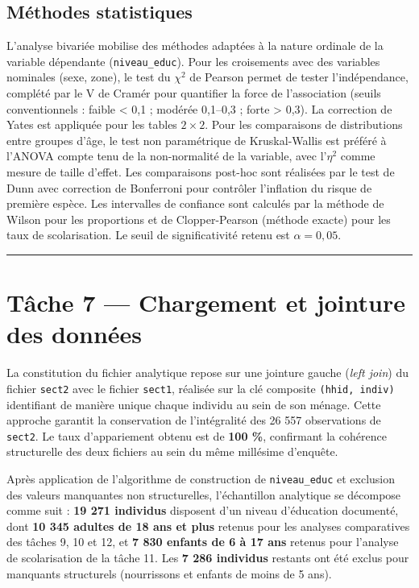 \documentclass[
]{article}
\begin{document}
\subsection{Méthodes statistiques}\label{muxe9thodes-statistiques}

L'analyse bivariée mobilise des méthodes adaptées à la nature ordinale
de la variable dépendante (\texttt{niveau\_educ}). Pour les croisements
avec des variables nominales (sexe, zone), le test du \(\chi^2\) de
Pearson permet de tester l'indépendance, complété par le V de Cramér
pour quantifier la force de l'association (seuils conventionnels :
faible \textless{} 0,1 ; modérée 0,1--0,3 ; forte \textgreater{} 0,3).
La correction de Yates est appliquée pour les tables \(2 \times 2\).
Pour les comparaisons de distributions entre groupes d'âge, le test non
paramétrique de Kruskal-Wallis est préféré à l'ANOVA compte tenu de la
non-normalité de la variable, avec l'\(\eta^2\) comme mesure de taille
d'effet. Les comparaisons post-hoc sont réalisées par le test de Dunn
avec correction de Bonferroni pour contrôler l'inflation du risque de
première espèce. Les intervalles de confiance sont calculés par la
méthode de Wilson pour les proportions et de Clopper-Pearson (méthode
exacte) pour les taux de scolarisation. Le seuil de significativité
retenu est \(\alpha = 0{,}05\).

\begin{center}\rule{0.5\linewidth}{0.5pt}\end{center}

\section{Tâche 7 --- Chargement et jointure des
données}\label{tuxe2che-7-chargement-et-jointure-des-donnuxe9es}

La constitution du fichier analytique repose sur une jointure gauche
(\emph{left join}) du fichier \texttt{sect2} avec le fichier
\texttt{sect1}, réalisée sur la clé composite \texttt{(hhid,\ indiv)}
identifiant de manière unique chaque individu au sein de son ménage.
Cette approche garantit la conservation de l'intégralité des 26 557
observations de \texttt{sect2}. Le taux d'appariement obtenu est de
\textbf{100 \%}, confirmant la cohérence structurelle des deux fichiers
au sein du même millésime d'enquête.

Après application de l'algorithme de construction de
\texttt{niveau\_educ} et exclusion des valeurs manquantes non
structurelles, l'échantillon analytique se décompose comme suit :
\textbf{19 271 individus} disposent d'un niveau d'éducation documenté,
dont \textbf{10 345 adultes de 18 ans et plus} retenus pour les analyses
comparatives des tâches 9, 10 et 12, et \textbf{7 830 enfants de 6 à 17
ans} retenus pour l'analyse de scolarisation de la tâche 11. Les
\textbf{7 286 individus} restants ont été exclus pour manquants
structurels (nourrissons et enfants de moins de 5 ans).
\end{document}

